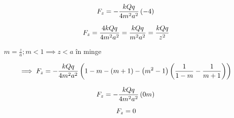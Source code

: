 \documentclass[12pt]{article}
\begin{document}
\begin{equation}
    F_{z} =- \frac{ kQq }{ 4m^{2} a^{2} } \left(  -4\right) \\
\end{equation}

\begin{equation}
    F_{z} = \frac{ 4kQq }{ 4m^{2} a^{2} } = \frac{kQq}{m^{2}a^{2}}=\frac{kQq}{z^{2}} \\
\end{equation}

$ m=\frac{z}{a} ; m<1 \implies z < a$ în minge 

\begin{equation}
   \implies F_{z} =- \frac{ kQq }{ 4m^{2} a^{2} } \left(  1-m  - ( m + 1)  - \left( m^{2} - 1 \right) \left( \frac{1}{  1 - m  } - \frac{1}{  m + 1  } \right) \right)\\
\end{equation}

\begin{equation}
    F_{z} =- \frac{ kQq }{ 4m^{2} a^{2} } \left( 0m \right) \\
\end{equation}

\begin{equation}
    F_{z} = 0 \\
\end{equation}
\end{document}
